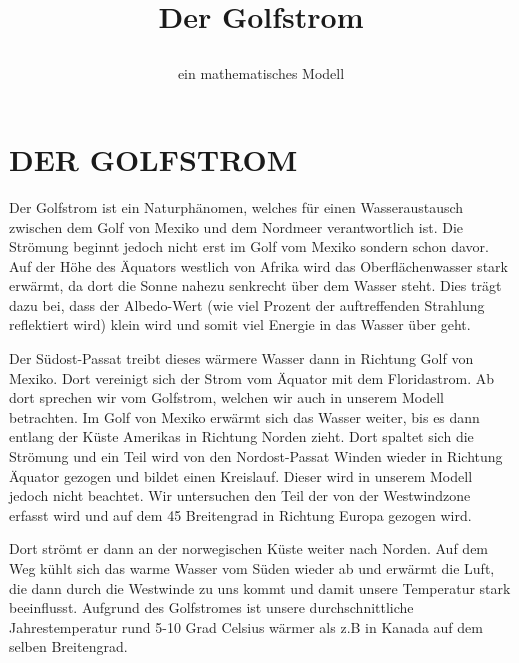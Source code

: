 \documentclass[a4paper,twoside]{article}
\begin{document}
	\title{Der Golfstrom\subtitle{ein mathematisches Modell} }
	
	\author{}
	

	
	\onecolumn \maketitle \normalsize \vfill

	\section{\uppercase{Der Golfstrom}}\label{sec:Golfstrom}

	\noindent Der Golfstrom ist ein Naturphänomen, welches für einen Wasseraustausch zwischen dem Golf von Mexiko und dem Nordmeer verantwortlich ist. Die Strömung beginnt jedoch nicht erst im Golf vom Mexiko sondern schon davor. Auf der Höhe des Äquators westlich von Afrika wird das Oberflächenwasser stark erwärmt, da dort die Sonne nahezu senkrecht über dem Wasser steht. Dies trägt dazu bei, dass der Albedo-Wert (wie viel Prozent der auftreffenden Strahlung reflektiert wird) klein wird und somit viel Energie in das Wasser über geht.

	Der Südost-Passat treibt dieses wärmere Wasser dann in Richtung Golf von Mexiko. Dort vereinigt sich der Strom vom Äquator mit dem Floridastrom. Ab dort sprechen wir vom Golfstrom, welchen wir auch in unserem Modell betrachten. Im Golf von Mexiko erwärmt sich das Wasser weiter, bis es dann entlang der Küste Amerikas in Richtung Norden zieht. Dort spaltet sich die Strömung und ein Teil wird von den Nordost-Passat Winden wieder in Richtung Äquator gezogen und bildet einen Kreislauf. Dieser wird in unserem Modell jedoch nicht beachtet. Wir untersuchen den Teil der von der Westwindzone erfasst wird und auf dem 45 Breitengrad in Richtung Europa gezogen wird.

	Dort strömt er dann an der norwegischen Küste weiter nach Norden. Auf dem Weg kühlt sich das warme Wasser vom Süden wieder ab und erwärmt die Luft, die dann durch die Westwinde zu uns kommt und damit unsere Temperatur stark beeinflusst. Aufgrund des Golfstromes ist unsere durchschnittliche Jahrestemperatur rund 5-10 Grad Celsius wärmer als z.B in Kanada auf dem selben Breitengrad. 
\end{document}

